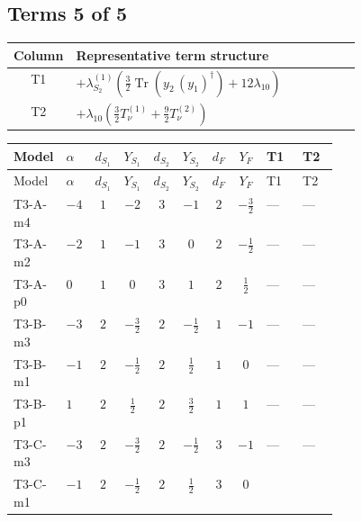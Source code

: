 \documentclass[8pt]{article}
\begin{document}
\begin{landscape}
\subsection*{Terms 5 of 5}
\begin{center}
\begin{tabular}{@{}c >{\raggedright\arraybackslash}p{0.82\linewidth}@{}}
\toprule
Column & Representative term structure \\
\midrule
T1 & \(\displaystyle +{\lambda_{S_2}^{(1)}} \left(\frac{3}{2} \operatorname{Tr}\!\left({y_2}\,\left({y_1}\right)^{\dagger}\right)+12 {\lambda_{10}}\right)\) \\
\midrule
T2 & \(\displaystyle +{\lambda_{10}} \left(\frac{3}{2} T_{\nu}^{(1)}+\frac{9}{2} T_{\nu}^{(2)}\right)\) \\
\midrule
\bottomrule
\end{tabular}
\end{center}
\smallskip
\tiny
\begin{longtable}{@{}llcccccc >{\raggedright\arraybackslash}p{0.21\linewidth} >{\raggedright\arraybackslash}p{0.21\linewidth}@{}}
\toprule
Model & $\alpha$ & $d_{S_1}$ & $Y_{S_1}$ & $d_{S_2}$ & $Y_{S_2}$ & $d_F$ & $Y_F$ & T1 & T2 \\
\midrule
\endfirsthead
\toprule
Model & $\alpha$ & $d_{S_1}$ & $Y_{S_1}$ & $d_{S_2}$ & $Y_{S_2}$ & $d_F$ & $Y_F$ & T1 & T2 \\
\midrule
\endhead
T3-A-m4 & $-4$ & $1$ & $-2$ & $3$ & $-1$ & $2$ & $-\frac{3}{2}$ & --- & --- \\
\midrule
T3-A-m2 & $-2$ & $1$ & $-1$ & $3$ & $0$ & $2$ & $-\frac{1}{2}$ & --- & --- \\
\midrule
T3-A-p0 & $0$ & $1$ & $0$ & $3$ & $1$ & $2$ & $\frac{1}{2}$ & --- & --- \\
\midrule
T3-B-m3 & $-3$ & $2$ & $-\frac{3}{2}$ & $2$ & $-\frac{1}{2}$ & $1$ & $-1$ & --- & --- \\
\midrule
T3-B-m1 & $-1$ & $2$ & $-\frac{1}{2}$ & $2$ & $\frac{1}{2}$ & $1$ & $0$ & --- & --- \\
\midrule
T3-B-p1 & $1$ & $2$ & $\frac{1}{2}$ & $2$ & $\frac{3}{2}$ & $1$ & $1$ & --- & --- \\
\midrule
T3-C-m3 & $-3$ & $2$ & $-\frac{3}{2}$ & $2$ & $-\frac{1}{2}$ & $3$ & $-1$ & --- & --- \\
\midrule
T3-C-m1 & $-1$ & $2$ & $-\frac{1}{2}$ & $2$ & $\frac{1}{2}$ & $3$ & $0$ & \scriptsize\adjustbox{max width=\linewidth}{$\begin{gathered} +{\lambda_{S_2}^{(1)}} \left(\frac{3}{2} \operatorname{Tr}\!\left({y_2}\,\left({y_1}\right)^{\dagger}\right)+12 {\lambda_{10}}\right)\end{gathered}$} & \scriptsize\adjustbox{max width=\linewidth}{$\begin{gathered} +{\lambda_{10}} \left(\frac{3}{2} T_{\nu}^{(1)}+\frac{9}{2} T_{\nu}^{(2)}\right)\end{gathered}$} \\

\end{longtable}
\end{landscape}
\end{document}
